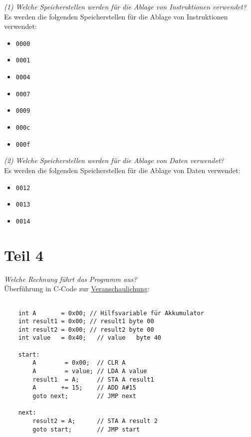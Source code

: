 \textit{(1) Welche Speicherstellen werden für die Ablage von Instruktionen verwendet?}\\

\noindent
Es werden die folgenden Speicherstellen für die Ablage von Instruktionen verwendet:

\begin{itemize}
    \itemsep0.5em
    \item \texttt{0000}
    \item \texttt{0001}
    \item \texttt{0004}
    \item \texttt{0007}
    \item \texttt{0009}
    \item \texttt{000c}
    \item \texttt{000f}
\end{itemize}

\vspace{5mm}

\noindent
\textit{(2) Welche Speicherstellen werden für die Ablage von Daten verwendet?}\\

\noindent
Es werden die folgenden Speicherstellen für die Ablage von Daten verwendet:

\begin{itemize}
    \itemsep0.5em
    \item \texttt{0012}
    \item \texttt{0013}
    \item \texttt{0014}
\end{itemize}

\section{Teil 4}

\noindent
\textit{Welche Rechnung führt das Programm aus?}\\

\noindent
Überführung in C-Code zur \underline{Veranschaulichung}:

\begin{verbatim}

    int A       = 0x00; // Hilfsvariable für Akkumulator
    int result1 = 0x00; // result1 byte 00
    int result2 = 0x00; // result2 byte 00
    int value   = 0x40;   // value   byte 40

    start:
        A        = 0x00;  // CLR A
        A        = value; // LDA A value
        result1  = A;     // STA A result1
        A       += 15;    // ADD A#15
        goto next;        // JMP next

    next:
        result2 = A;      // STA A result 2
        goto start;       // JMP start
\end{verbatim}\\

